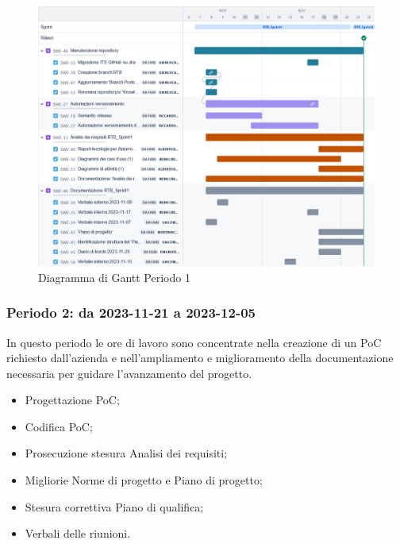 \documentclass[10pt, a4paper]{article}
\begin{document}
{{{{{{{{\begin{itemize}
\end{itemize}
\vspace{1em}

 \begin{figure}[H]
        \centering        
        \includegraphics[width=15.5cm]{gantt/ganttPeriodo1.png}
        \caption{Diagramma di Gantt Periodo 1 }
    \end{figure}
\newpage
\subsubsection{Periodo 2: da 2023-11-21 a 2023-12-05}
In questo periodo le ore di lavoro sono concentrate nella creazione di un PoC richiesto dall'azienda e nell'ampliamento e miglioramento della documentazione necessaria per guidare l'avanzamento del progetto.
\begin{itemize}
    \item Progettazione PoC;
    \item Codifica PoC;
    \item Prosecuzione stesura Analisi dei requisiti;
    \item Migliorie Norme di progetto e Piano di progetto;
    \item Stesura correttiva Piano di qualifica;
    \item Verbali delle riunioni.
  

\end{itemize}}}}}}}}}
\end{document}
